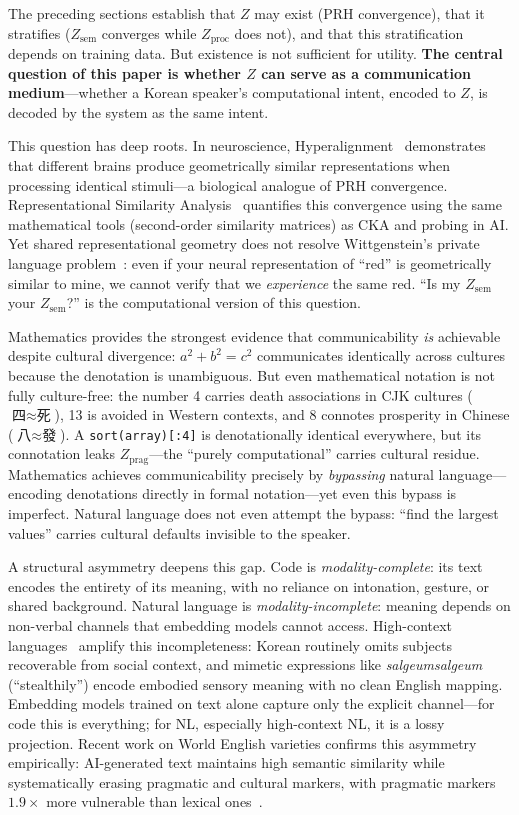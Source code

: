 \documentclass[11pt]{article}
\theoremstyle{definition}
\newcommand{\Zsem}{Z_{\text{sem}}}
\newcommand{\Zproc}{Z_{\text{proc}}}
\newcommand{\Zprag}{Z_{\text{prag}}}
\begin{document}
The preceding sections establish that $Z$ may exist (PRH convergence), that it stratifies ($\Zsem$ converges while $\Zproc$ does not), and that this stratification depends on training data. But existence is not sufficient for utility. \textbf{The central question of this paper is whether $Z$ can serve as a communication medium}---whether a Korean speaker's computational intent, encoded to $Z$, is decoded by the system as the same intent.

This question has deep roots. In neuroscience, Hyperalignment~\cite{haxby2011hyperalignment} demonstrates that different brains produce geometrically similar representations when processing identical stimuli---a biological analogue of PRH convergence. Representational Similarity Analysis~\cite{kriegeskorte2008rsa} quantifies this convergence using the same mathematical tools (second-order similarity matrices) as CKA and probing in AI. Yet shared representational geometry does not resolve Wittgenstein's private language problem~\cite{wittgenstein1953}: even if your neural representation of ``red'' is geometrically similar to mine, we cannot verify that we \emph{experience} the same red. ``Is my $\Zsem$ your $\Zsem$?'' is the computational version of this question.

Mathematics provides the strongest evidence that communicability \emph{is} achievable despite cultural divergence: $a^2 + b^2 = c^2$ communicates identically across cultures because the denotation is unambiguous. But even mathematical notation is not fully culture-free: the number 4 carries death associations in CJK cultures ($\text{四} \approx \text{死}$), 13 is avoided in Western contexts, and 8 connotes prosperity in Chinese ($\text{八} \approx \text{發}$). A \texttt{sort(array)[:4]} is denotationally identical everywhere, but its connotation leaks $\Zprag$---the ``purely computational'' carries cultural residue. Mathematics achieves communicability precisely by \emph{bypassing} natural language---encoding denotations directly in formal notation---yet even this bypass is imperfect. Natural language does not even attempt the bypass: ``find the largest values'' carries cultural defaults invisible to the speaker.

A structural asymmetry deepens this gap. Code is \emph{modality-complete}: its text encodes the entirety of its meaning, with no reliance on intonation, gesture, or shared background. Natural language is \emph{modality-incomplete}: meaning depends on non-verbal channels that embedding models cannot access. High-context languages~\cite{hall1976beyond} amplify this incompleteness: Korean routinely omits subjects recoverable from social context, and mimetic expressions like \emph{salgeumsalgeum} (``stealthily'') encode embodied sensory meaning with no clean English mapping. Embedding models trained on text alone capture only the explicit channel---for code this is everything; for NL, especially high-context NL, it is a lossy projection. Recent work on World English varieties confirms this asymmetry empirically: AI-generated text maintains high semantic similarity while systematically erasing pragmatic and cultural markers, with pragmatic markers $1.9\times$ more vulnerable than lexical ones~\cite{culturalghosting2026}.
\end{document}

